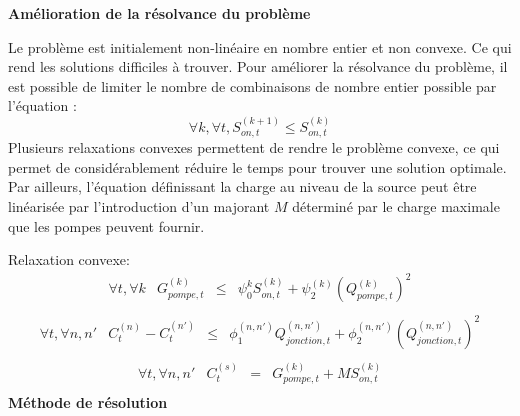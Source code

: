 \documentclass{article}
\begin{document}
\textbf{Amélioration de la résolvance du problème}
\begin{multicols}{2}
    Le problème est initialement non-linéaire en nombre entier et non convexe. Ce qui rend les solutions difficiles à trouver. Pour améliorer la résolvance du problème, il est possible de limiter le nombre de combinaisons de nombre entier possible par l'équation :
    \begin{equation}
        \tag{Symétrie}
        \forall k, \forall t, S_{on,t}^{(k+1)}\leq S_{on,t}^{(k)}
    \end{equation}
    Plusieurs relaxations convexes permettent de rendre le problème convexe, ce qui permet de considérablement réduire le temps pour trouver une solution optimale.\\
    Par ailleurs, l'équation définissant la charge au niveau de la source peut être linéarisée par l'introduction d'un majorant $M$ déterminé par le charge maximale que les pompes peuvent fournir.
\end{multicols}
Relaxation convexe:
\begin{equation}
    \tag{Gain charge pompe relax.}
    \left.
        \begin{array}{lccc}
            \forall t, \forall k   &   G_{pompe,t}^{(k)}     & \leq &   \psi_0^{k}S_{on,t}^{(k)} + \psi_2^{(k)}(Q_{pompe,t}^{(k)})^2\\[0.2cm]
        \end{array}
    \right.
\end{equation}
\begin{equation}
    \tag{Perte charge flux relax.}
    \left.
        \begin{array}{lcccc}
            \forall t, \forall n,n'   &   C_t^{(n)}  - C_t^{(n')}    & \leq &   \phi_1^{(n,n')}Q_{jonction,t}^{(n,n')} + \phi_2^{(n,n')}(Q_{jonction,t}^{(n,n')})^2\\[0.2cm]
        \end{array}
    \right.
\end{equation}
\begin{equation}
    \tag{Charge source relax.}
    \left.
        \begin{array}{lcccc}
            \forall t, \forall n,n'   &   C_t^{(s)} & = & G_{pompe,t}^{(k)} + M S_{on,t}^{(k)}\\[0.2cm]
        \end{array}
    \right.
\end{equation}
\textbf{Méthode de résolution}\\
\end{document}
